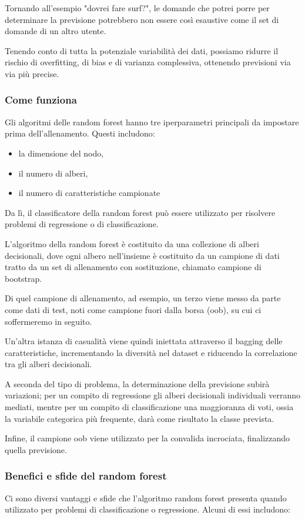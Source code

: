 Tornando all'esempio "dovrei fare surf?", le domande che potrei porre per determinare la previsione potrebbero non essere così esaustive come il set di domande di un altro utente. 

Tenendo conto di tutta la potenziale variabilità dei dati, possiamo ridurre il rischio di overfitting, di bias e di varianza complessiva, ottenendo previsioni via via più precise.

\subsubsection{Come funziona}
Gli algoritmi delle random forest hanno tre iperparametri principali da impostare prima dell'allenamento. 
Questi includono: 

\begin{itemize}
  \item la dimensione del nodo, 
  \item il numero di alberi, 
  \item il numero di caratteristiche campionate
\end{itemize}

Da lì, il classificatore della random forest può essere utilizzato per risolvere problemi di regressione o di classificazione.

L'algoritmo della random forest è costituito da una collezione di alberi decisionali, dove ogni albero nell'insieme è costituito da un campione di dati tratto da un set di allenamento con sostituzione, chiamato campione di bootstrap. 

Di quel campione di allenamento, ad esempio, un terzo viene messo da parte come dati di test, noti come campione fuori dalla borsa (oob), su cui ci soffermeremo in seguito. 

Un'altra istanza di casualità viene quindi iniettata attraverso il bagging delle caratteristiche, incrementando la diversità nel dataset e riducendo la correlazione tra gli alberi decisionali. 

A seconda del tipo di problema, la determinazione della previsione subirà variazioni; per un compito di regressione gli alberi decisionali individuali verranno mediati, mentre per un compito di classificazione una maggioranza di voti, ossia la variabile categorica più frequente, darà come risultato la classe prevista. 

Infine, il campione oob viene utilizzato per la convalida incrociata, finalizzando quella previsione.

\subsubsection{Benefici e sfide del random forest}
Ci sono diversi vantaggi e sfide che l'algoritmo random forest presenta quando utilizzato per problemi di classificazione o regressione. Alcuni di essi includono:


